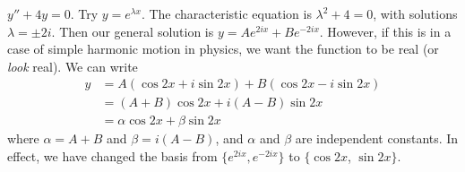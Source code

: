 \documentclass[a4paper]{article}
\begin{document}
  \begin{eg}
    $y'' + 4y = 0$. Try $y = e^{\lambda x}$. The characteristic equation is $\lambda^2 + 4 = 0$, with solutions $\lambda = \pm 2i$. Then our general solution is $y = Ae^{2ix} + Be^{-2ix}$. However, if this is in a case of simple harmonic motion in physics, we want the function to be real (or \emph{look} real). We can write
    \begin{align*}
      y &= A(\cos 2x + i\sin 2x) + B(\cos 2x - i\sin 2x)\\
      &= (A + B)\cos 2x + i(A - B)\sin 2x\\
      &= \alpha\cos 2x + \beta\sin 2x
    \end{align*}
    where $\alpha = A + B$ and $\beta = i(A - B)$, and $\alpha$ and $\beta$ are independent constants.
    \note In effect, we have changed the basis from $\{e^{2ix}, e^{-2ix}\}$ to $\{\cos 2x$, $\sin 2x\}$.
  \end{eg}
\end{document}

